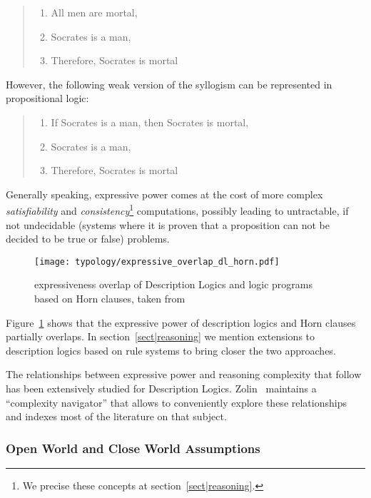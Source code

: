 \begin{quote}
\begin{enumerate}
    \item All men are mortal,
    \item Socrates is a man,
    \item Therefore, Socrates is mortal
\end{enumerate}
\end{quote}

However, the following weak version of the syllogism can be represented in
propositional logic:

\begin{quote}
\begin{enumerate}
    \item If Socrates is a man, then Socrates is mortal,
    \item Socrates is a man,
    \item Therefore, Socrates is mortal
\end{enumerate}
\end{quote}

Generally speaking, expressive power comes at the cost of more complex
\emph{satisfiability} and \emph{consistency}\footnote{We precise these concepts
at section~\ref{sect|reasoning}.} computations, possibly leading to
untractable, if not undecidable (\ie systems where it is proven that a
proposition can not be decided to be true or false) problems.

\begin{figure}
    \centering
    \texttt{[image: typology/expressive\_overlap\_dl\_horn.pdf]}
    \caption{expressiveness overlap of Description Logics and logic programs
    based on Horn clauses, taken from~\cite{Grosof2003}}
    \label{fig|overlap_dl_horn}
\end{figure}

Figure~\ref{fig|overlap_dl_horn} shows that the expressive power of description
logics and Horn clauses partially overlaps. In section~\ref{sect|reasoning} we
mention extensions to description logics based on rule systems to bring closer
the two approaches.

The relationships between expressive power and reasoning complexity that follow
has been extensively studied for Description Logics.
Zolin~\cite{ZolinDLComplexityNavigator} maintains a ``complexity navigator''
that allows to conveniently explore these relationships and indexes most of the
literature on that subject.

\subsubsection{Open World and Close World Assumptions}
\label{sect|owa-cwa}

